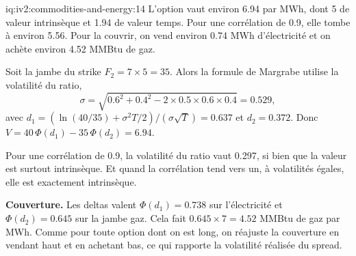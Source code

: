 \begin{solution}{iq:iv2:commodities-and-energy:14}
L'option vaut environ 6.94 par MWh, dont 5 de valeur intrinsèque et 1.94 de valeur temps. Pour une corrélation de 0.9, elle tombe à environ 5.56. Pour la couvrir, on vend environ 0.74 MWh d'électricité et on achète environ 4.52 MMBtu de gaz.

Soit la jambe du strike $F_2 = 7 \times 5 = 35$. Alors la formule de Margrabe utilise la volatilité du ratio,
\[
\sigma = \sqrt{0.6^2 + 0.4^2 - 2 \times 0.5 \times 0.6 \times 0.4} = 0.529,
\]
avec $d_1 = (\ln(40/35) + \sigma^2 T/2)/(\sigma\sqrt{T}) = 0.637$ et $d_2 = 0.372$. Donc $V = 40\,\Phi(d_1) - 35\,\Phi(d_2) = 6.94$.

Pour une corrélation de 0.9, la volatilité du ratio vaut 0.297, si bien que la valeur est surtout intrinsèque. Et quand la corrélation tend vers un, à volatilités égales, elle est exactement intrinsèque.

\textbf{Couverture.} Les deltas valent $\Phi(d_1) = 0.738$ sur l'électricité et $\Phi(d_2) = 0.645$ sur la jambe gaz. Cela fait $0.645 \times 7 = 4.52$ MMBtu de gaz par MWh. Comme pour toute option dont on est long, on réajuste la couverture en vendant haut et en achetant bas, ce qui rapporte la volatilité réalisée du spread.

\end{solution}

